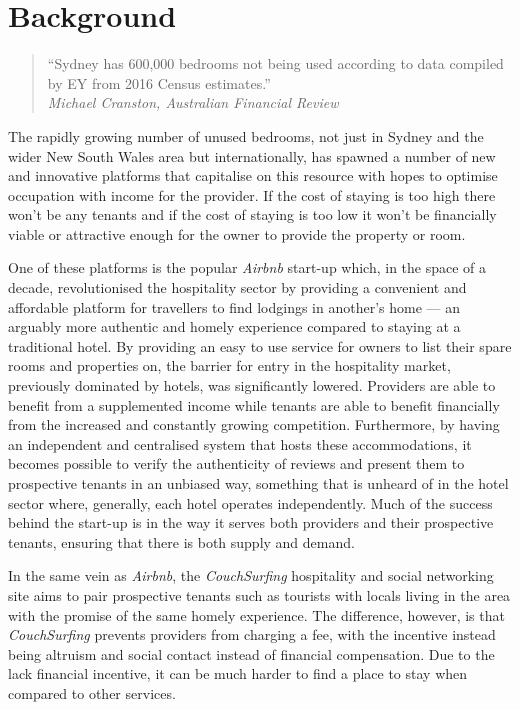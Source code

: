 \documentclass[12pt,a4paper]{article}
\begin{document}
\section*{Background}

\smallskip
\begin{quote}
  ``Sydney has 600,000 bedrooms not being used according to data
compiled by EY from 2016 Census estimates.'' \\
  \hspace*{\fill}\emph{Michael Cranston, Australian Financial Review}
\end{quote}

The rapidly growing number of unused bedrooms, not just in Sydney and the wider New South Wales area but internationally, has spawned a number of new and innovative platforms that capitalise on this resource with hopes to optimise occupation with income for the provider. If the cost of staying is too high there won't be any tenants and if the cost of staying is too low it won't be financially viable or attractive enough for the owner to provide the property or room.

One of these platforms is the popular \emph{Airbnb} start-up which, in the space
of a decade, revolutionised the hospitality sector by providing a convenient and
affordable platform for travellers to find lodgings in another's home --- an arguably more authentic and homely experience compared to staying at a traditional hotel. By providing an easy to use service for owners to list their spare rooms and properties on, the barrier for entry in the hospitality market, previously dominated by hotels, was significantly lowered. Providers are able to benefit from a supplemented income while tenants are able to benefit financially from the increased and constantly growing competition. Furthermore, by having an independent and centralised system that hosts these accommodations, it becomes possible to verify the authenticity of reviews and present them to prospective tenants in an unbiased way, something that is unheard of in the hotel sector where, generally, each hotel operates independently. Much of the success behind the start-up is in the way it serves both providers and their prospective tenants, ensuring that there is both supply and demand.

In the same vein as \emph{Airbnb}, the \emph{CouchSurfing} hospitality and social networking site aims to pair prospective tenants such as tourists with locals living in the area with the promise of the same homely experience. The difference, however, is that \emph{CouchSurfing} prevents providers from charging a fee, with the incentive instead being altruism and social contact instead of financial compensation. Due to the lack financial incentive, it can be much harder to find a place to stay when compared to other services.
\end{document}

